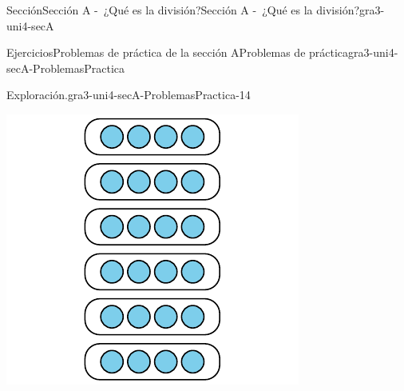 \begin{sectionptx}{Sección}{Sección A -~¿Qué es la división?}{}{Sección A -~¿Qué es la división?}{}{}{gra3-uni4-secA}
\begin{exercises-subsection}{Ejercicios}{Problemas de práctica de la sección A}{}{Problemas de práctica}{}{}{gra3-uni4-secA-ProblemasPractica}
\begin{divisionexercise}{12}{Exploración.}{}{gra3-uni4-secA-ProblemasPractica-14}
\begin{sidebyside}{3}{0}{0}{0.02}
\begin{sbspanel}{0.32}
\includegraphics[max width=\linewidth, center]{external/svg-source/tikz-file-151676.pdf}
\end{sbspanel}%
\end{sidebyside}%
\end{divisionexercise}%
\end{exercises-subsection}
\end{sectionptx}
%
%
\typeout{************************************************}
\typeout{************************************************}
%
